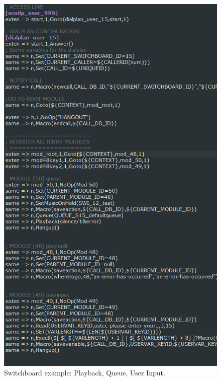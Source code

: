 \begin{figure}[!ht]
  \caption{Switchboard example: Playback, Queue, User Input.}
  \centering
    \includegraphics[width=1\textwidth]{img/exampleDialplan.png}
\end{figure}